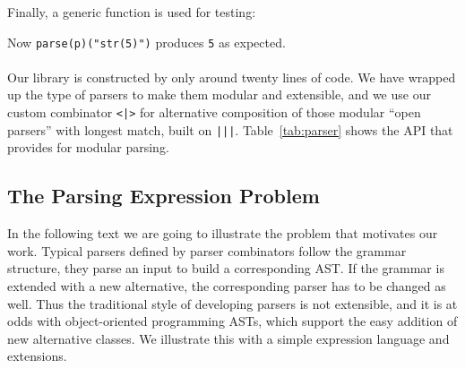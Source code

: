 Finally, a generic 
function is used for testing:

Now \lstinline{parse(p)("str(5)")} produces \lstinline{5} as expected.

\paragraph{\name} Our library is constructed by only around twenty lines of code. We have wrapped up the type of parsers
to make them modular and extensible, and we use our custom combinator \lstinline{<|>} for alternative composition of those
modular ``open parsers'' with longest match, built on \lstinline{|||}. Table~\ref{tab:parser} shows the API that \name provides for modular parsing.

\subsection{The Parsing Expression Problem}\label{subsec:overview-problem}


In the following text we are going to illustrate the problem that motivates our work.
Typical parsers defined by parser combinators follow the grammar
structure, they parse an input to build a corresponding AST. If the grammar is extended
with a new alternative, the corresponding parser has to be changed as
well. Thus the traditional style of developing parsers is not
extensible, and it is at odds with object-oriented programming ASTs,
which support the easy addition of new alternative classes. We
illustrate this with a simple expression language and extensions.

